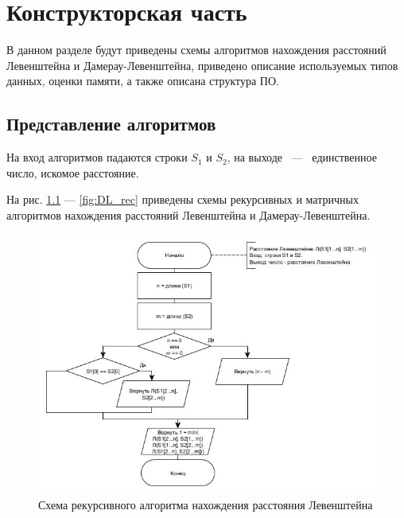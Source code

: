 \chapter{Конструкторская часть}
В данном разделе будут приведены схемы алгоритмов нахождения расстояний Левенштейна и Дамерау-Левенштейна, приведено описание используемых типов данных, оценки памяти, а также описана структура ПО.

\section{Представление алгоритмов}

На вход алгоритмов падаются строки $S_{1}$ и $S_{2}$, на выходе ~---~ единственное число, искомое расстояние.

На рис. \ref{fig:L_rec} --- \ref{fig:DL_rec} приведены схемы рекурсивных и матричных алгоритмов нахождения расстояний Левенштейна и Дамерау-Левенштейна.

\clearpage

\begin{figure}[h]
	\centering
	\includegraphics[scale=0.8]{img/levrec.jpg}
	\caption{Схема рекурсивного алгоритма нахождения расстояния Левенштейна}
	\label{fig:L_rec}
\end{figure}

\clearpage

